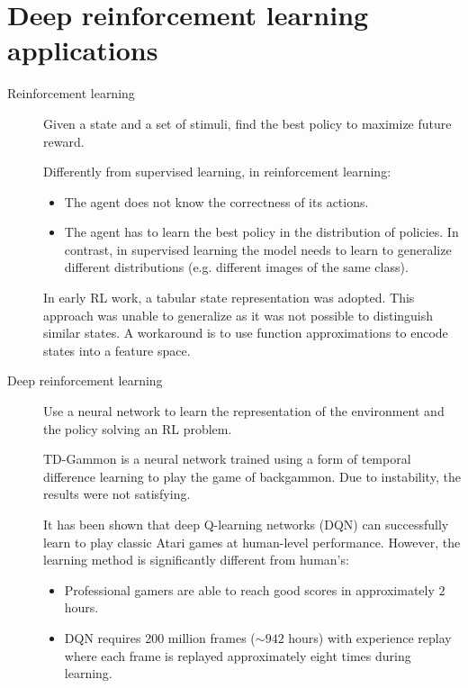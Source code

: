 \section{Deep reinforcement learning applications}

\begin{description}
    \item[Reinforcement learning] 
        Given a state and a set of stimuli, find the best policy to maximize future reward.
        
        \begin{remark}
            Differently from supervised learning, in reinforcement learning:
            \begin{itemize}
                \item The agent does not know the correctness of its actions.
                \item The agent has to learn the best policy in the distribution of policies. 
                    In contrast, in supervised learning the model needs to learn to generalize different distributions (e.g. different images of the same class).
            \end{itemize}
        \end{remark}

        \begin{remark}
            In early RL work, a tabular state representation was adopted. 
            This approach was unable to generalize as it was not possible to distinguish similar states. 
            A workaround is to use function approximations to encode states into a feature space.
        \end{remark}

    \item[Deep reinforcement learning] 
        Use a neural network to learn the representation of the environment and the policy solving an RL problem.

        \begin{casestudy}
            TD-Gammon is a neural network trained using a form of temporal difference learning to play the game of backgammon.
            Due to instability, the results were not satisfying.
        \end{casestudy}

        \begin{casestudy}
            It has been shown that deep Q-learning networks (DQN) can successfully learn to play classic Atari games at human-level performance.
            However, the learning method is significantly different from human's:
            \begin{itemize}
                \item Professional gamers are able to reach good scores in approximately $2$ hours.
                \item DQN requires 200 million frames ($\sim 942$ hours) with experience replay where each frame is replayed approximately eight times during learning.
            \end{itemize}


\end{casestudy}
\end{description}
